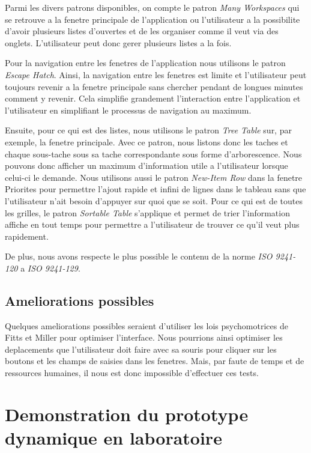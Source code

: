 \documentclass[letterpaper, oneside, 12pt, these, creativecommons]{thETS}
\begin{document}
Parmi les divers patrons disponibles, on compte le patron \emph{Many Workspaces} qui se retrouve a la fenetre principale de l'application ou l'utilisateur a la possibilite d'avoir plusieurs listes d'ouvertes et de les organiser comme il veut via des onglets. L'utilisateur peut donc gerer plusieurs listes a la fois. 

Pour la navigation entre les fenetres de l'application nous utilisons le patron \emph{Escape Hatch}. Ainsi, la navigation entre les fenetres est limite et l'utilisateur peut toujours revenir a la fenetre principale sans chercher pendant de longues minutes comment y revenir. Cela simplifie grandement l'interaction entre l'application et l'utilisateur en simplifiant le processus de navigation au maximum. 

Ensuite, pour ce qui est des listes, nous utilisons le patron \emph{Tree Table} sur, par exemple, la fenetre principale. Avec ce patron, nous listons donc les taches et chaque sous-tache sous sa tache correspondante sous forme d'arborescence. Nous pouvons donc afficher un maximum d'information utile a l'utilisateur lorsque celui-ci le demande. Nous utilisons aussi le patron \emph{New-Item Row} dans la fenetre Priorites pour permettre l'ajout rapide et infini de lignes dans le tableau sans que l'utilisateur n'ait besoin d'appuyer sur quoi que se soit. Pour ce qui est de toutes les grilles, le patron \emph{Sortable Table} s'applique et permet de trier l'information affiche en tout temps pour permettre a l'utilisateur de trouver ce qu'il veut plus rapidement. 

De plus, nous avons respecte le plus possible le contenu de la norme \emph{ISO 9241-120} a \emph{ISO 9241-129}.

\section{Ameliorations possibles}

Quelques ameliorations possibles seraient d'utiliser les lois psychomotrices de Fitts et Miller pour optimiser l'interface. Nous pourrions ainsi optimiser les deplacements que l'utilisateur doit faire avec sa souris pour cliquer sur les boutons et les champs de saisies dans les fenetres. Mais, par faute de temps et de ressources humaines, il nous est donc impossible d'effectuer ces tests.

\chapter{Demonstration du prototype dynamique en laboratoire}
\end{document}
